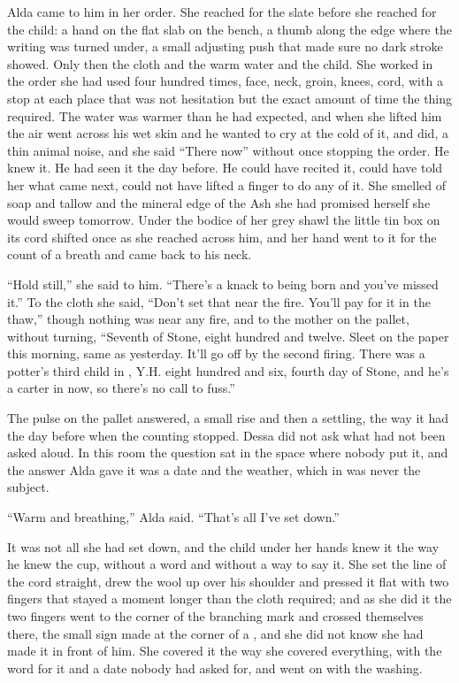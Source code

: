 Alda came to him in her order. She reached for the slate before she reached for the child: a hand on the flat slab on the bench, a thumb along the edge where the writing was turned under, a small adjusting push that made sure no dark stroke showed. Only then the cloth and the warm water and the child. She worked in the order she had used four hundred times, face, neck, groin, knees, cord, with a stop at each place that was not hesitation but the exact amount of time the thing required. The water was warmer than he had expected, and when she lifted him the air went across his wet skin and he wanted to cry at the cold of it, and did, a thin animal noise, and she said “There now” without once stopping the order. He knew it. He had seen it the day before. He could have recited it, could have told her what came next, could not have lifted a finger to do any of it. She smelled of soap and tallow and the mineral edge of the Ash she had promised herself she would sweep tomorrow. Under the bodice of her grey shawl the little tin box on its cord shifted once as she reached across him, and her hand went to it for the count of a breath and came back to his neck.

“Hold still,” she said to him. “There's a knack to being born and you've missed it.” To the cloth she said, “Don't set that near the fire. You'll pay for it in the thaw,” though nothing was near any fire, and to the mother on the pallet, without turning, “Seventh of Stone, eight hundred and twelve. Sleet on the paper this morning, same as yesterday. It'll go off by the second firing. There was a potter's third child in , Y.H. eight hundred and six, fourth day of Stone, and he's a carter in  now, so there's no call to fuss.”

The pulse on the pallet answered, a small rise and then a settling, the way it had the day before when the counting stopped. Dessa did not ask what had not been asked aloud. In this room the question sat in the space where nobody put it, and the answer Alda gave it was a date and the weather, which in  was never the subject.

“Warm and breathing,” Alda said. “That's all I've set down.”

It was not all she had set down, and the child under her hands knew it the way he knew the cup, without a word and without a way to say it. She set the line of the cord straight, drew the wool up over his shoulder and pressed it flat with two fingers that stayed a moment longer than the cloth required; and as she did it the two fingers went to the corner of the branching mark and crossed themselves there, the small sign made at the corner of a , and she did not know she had made it in front of him. She covered it the way she covered everything, with the word for it and a date nobody had asked for, and went on with the washing.

